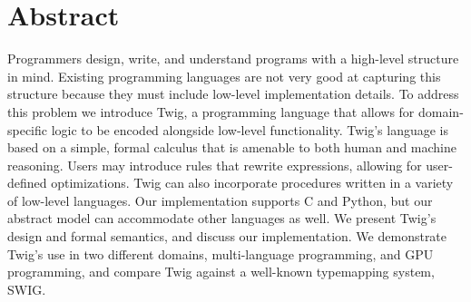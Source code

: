 
\chapter{Abstract}

Programmers design, write, and understand programs with a high-level structure
in mind. Existing programming languages are not very good at capturing this
structure because they must include low-level implementation details. To
address this problem we introduce Twig, a programming language that allows for
domain-specific logic to be encoded alongside low-level functionality. Twig's
language is based on a simple, formal calculus that is amenable to both human
and machine reasoning. Users may introduce rules that rewrite expressions,
allowing for user-defined optimizations. Twig can also incorporate procedures
written in a variety of low-level languages. Our implementation supports C and
Python, but our abstract model can accommodate other languages as well. We
present Twig's design and formal semantics, and discuss our implementation. We
demonstrate Twig's use in two different domains, multi-language programming,
and GPU programming, and compare Twig against a well-known typemapping system,
SWIG.
